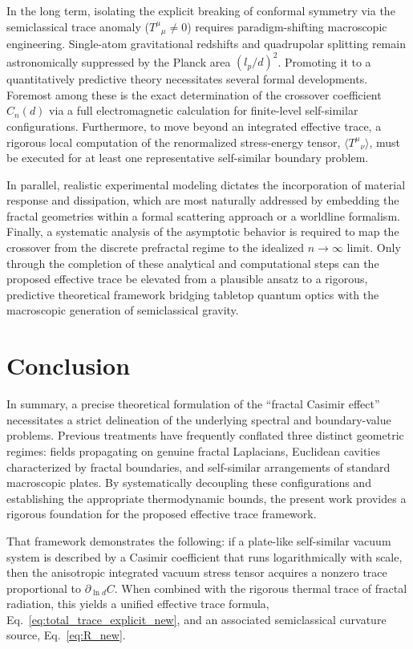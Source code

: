 \documentclass[12pt,letterpaper]{article}
\begin{document}
In the long term, isolating the explicit breaking of conformal symmetry via the semiclassical trace anomaly ($T^\mu{}_{\mu} \neq 0$) requires paradigm-shifting macroscopic engineering. Single-atom gravitational redshifts and quadrupolar splitting remain astronomically suppressed by the Planck area $(l_p/d)^2$. Promoting it to a quantitatively predictive theory necessitates several formal developments. Foremost among these is the exact determination of the crossover coefficient $C_n(d)$ via a full electromagnetic calculation for finite-level self-similar configurations. Furthermore, to move beyond an integrated effective trace, a rigorous local computation of the renormalized stress-energy tensor, $\langle T^\mu{}_{\nu}\rangle$, must be executed for at least one representative self-similar boundary problem.

In parallel, realistic experimental modeling dictates the incorporation of material response and dissipation, which are most naturally addressed by embedding the fractal geometries within a formal scattering approach or a worldline formalism. Finally, a systematic analysis of the asymptotic behavior is required to map the crossover from the discrete prefractal regime to the idealized $n\to\infty$ limit. Only through the completion of these analytical and computational steps can the proposed effective trace be elevated from a plausible ansatz to a rigorous, predictive theoretical framework bridging tabletop quantum optics with the macroscopic generation of semiclassical gravity.

\section{Conclusion}
In summary, a precise theoretical formulation of the ``fractal Casimir effect'' necessitates a strict delineation of the underlying spectral and boundary-value problems.
Previous treatments have frequently conflated three distinct geometric regimes: fields propagating on genuine fractal Laplacians, Euclidean cavities characterized by fractal boundaries, and self-similar arrangements of standard macroscopic plates.
By systematically decoupling these configurations and establishing the appropriate thermodynamic bounds, the present work provides a rigorous foundation for the proposed effective trace framework.

That framework demonstrates the following: if a plate-like self-similar vacuum system is described by a Casimir coefficient that runs logarithmically with scale, then the anisotropic integrated vacuum stress tensor acquires a nonzero trace proportional to $\partial_{\ln d}C$.
When combined with the rigorous thermal trace of fractal radiation, this yields a unified effective trace formula, Eq.~\eqref{eq:total_trace_explicit_new}, and an associated semiclassical curvature source, Eq.~\eqref{eq:R_new}.
\end{document}
